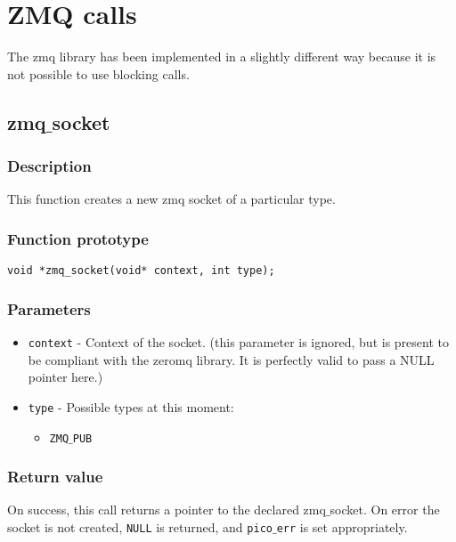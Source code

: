 \section{ZMQ calls} 
The zmq library has been implemented in a slightly different way because it is not
possible to use blocking calls.



\subsection{zmq$\_$socket}

\subsubsection*{Description}
This function creates a new zmq socket of a particular type.

\subsubsection*{Function prototype}
\begin{verbatim}
void *zmq_socket(void* context, int type);
\end{verbatim}

\subsubsection*{Parameters}
\begin{itemize}[noitemsep]
\item \texttt{context} - Context of the socket. (this parameter is ignored, but is present to be compliant with the zeromq library. It is perfectly valid to pass a NULL pointer here.)
\item \texttt{type} - Possible types at this moment:
\begin{itemize}[noitemsep]
\item \texttt{ZMQ$\_$PUB}
\end{itemize}
\end{itemize}

\subsubsection*{Return value}
On success, this call returns a pointer to the declared zmq$\_$socket. 
On error the socket is not created, \texttt{NULL} is returned, and \texttt{pico$\_$err} is set appropriately.

